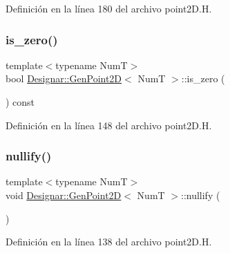 Definición en la línea 180 del archivo point2\+D.\+H.

\mbox{\label{class_designar_1_1_gen_point2_d_a75d3dd925cc99701000be4cc0c6967fd}} 
\subsubsection{\texorpdfstring{is\+\_\+zero()}{is\_zero()}}
{\footnotesize\ttfamily template$<$typename NumT$>$ \\
bool \hyperlink{class_designar_1_1_gen_point2_d}{Designar\+::\+Gen\+Point2D}$<$ NumT $>$\+::is\+\_\+zero (\begin{DoxyParamCaption}{ }\end{DoxyParamCaption}) const\hspace{0.3cm}{\ttfamily [inline]}}



Definición en la línea 148 del archivo point2\+D.\+H.

\mbox{\label{class_designar_1_1_gen_point2_d_a256d6fda1a250b7a664b76b7c8f914d7}} 
\subsubsection{\texorpdfstring{nullify()}{nullify()}}
{\footnotesize\ttfamily template$<$typename NumT$>$ \\
void \hyperlink{class_designar_1_1_gen_point2_d}{Designar\+::\+Gen\+Point2D}$<$ NumT $>$\+::nullify (\begin{DoxyParamCaption}{ }\end{DoxyParamCaption})\hspace{0.3cm}{\ttfamily [inline]}}



Definición en la línea 138 del archivo point2\+D.\+H.

\mbox{\label{class_designar_1_1_gen_point2_d_a9f54b6e39d8ea1b2eb2fdab5ce548c9f}} 
